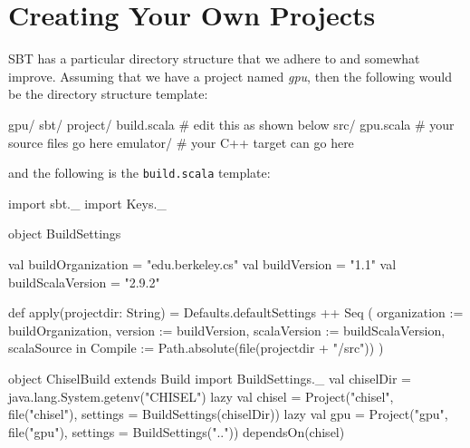 \documentclass[twocolumn, 10pt]{article}
\begin{document}
\section{Creating Your Own Projects}

SBT has a particular directory structure that we adhere to and
somewhat improve.  Assuming that we have a project named {\em gpu},
then the following would be the directory structure template:

\begin{bash}
gpu/
  sbt/
    project/
      build.scala # edit this as shown below
  src/ 
    gpu.scala     # your source files go here
  emulator/       # your C++ target can go here
\end{bash}

\noindent
and the following is the \verb+build.scala+ template:

\begin{scala}
import sbt._
import Keys._

object BuildSettings {
  val buildOrganization = "edu.berkeley.cs"
  val buildVersion = "1.1"
  val buildScalaVersion = "2.9.2"

  def apply(projectdir: String) = {
    Defaults.defaultSettings ++ Seq (
      organization := buildOrganization,
      version      := buildVersion,
      scalaVersion := buildScalaVersion,
      scalaSource in Compile := 
        Path.absolute(file(projectdir + "/src"))
    )
  }
}

object ChiselBuild extends Build {
  import BuildSettings._
  val chiselDir = java.lang.System.getenv("CHISEL")
  lazy val chisel = 
    Project("chisel", file("chisel"), 
            settings = BuildSettings(chiselDir))
  lazy val gpu =
    Project("gpu", file("gpu"), 
            settings = BuildSettings("..")) 
      dependsOn(chisel)
}
\end{scala}
\end{document}
